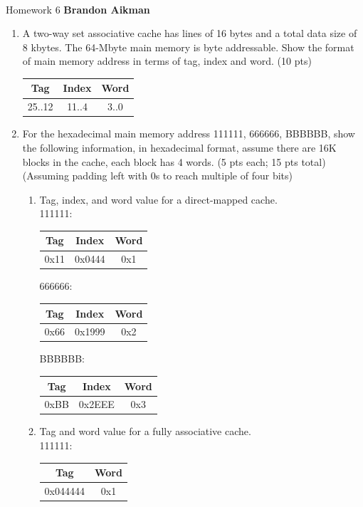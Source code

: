 \documentclass[12pt]{article}
\begin{document}
 \\
Homework 6 \hfill {\bf Brandon Aikman} \\

\begin{enumerate}
	\item A two-way set associative cache has lines of 16 bytes and a total data size of 8 kbytes. The 64-Mbyte main memory is byte addressable. Show the format of main memory address in terms of tag, index and word. (10 pts) \\
	\begin{tabular}{|c|c|c|}
        \hline
        Tag & Index & Word \\
        \hline
        25..12 & 11..4 & 3..0 \\
        \hline
    \end{tabular}
	\item For the hexadecimal main memory address 111111, 666666, BBBBBB, show the following information, in hexadecimal format, assume there are 16K blocks in the cache, each block has 4 words. (5 pts each; 15 pts total) \\
	(Assuming padding left with 0s to reach multiple of four bits)
    \begin{enumerate}
        \item Tag, index, and word value for a direct-mapped cache. \\
            111111: 
            \begin{tabular}{|c|c|c|}
                \hline
                Tag & Index & Word \\
                \hline
                0x11 & 0x0444 & 0x1 \\
                \hline
            \end{tabular}

            666666: 
            \begin{tabular}{|c|c|c|}
                \hline
                Tag & Index & Word \\
                \hline
                0x66 & 0x1999 & 0x2 \\
                \hline
            \end{tabular}

            BBBBBB: 
            \begin{tabular}{|c|c|c|}
                \hline
                Tag & Index & Word \\
                \hline
                0xBB & 0x2EEE & 0x3 \\
                \hline
            \end{tabular}
        \item Tag and word value for a fully associative cache. \\
            111111: 
            \begin{tabular}{|c|c|}
                \hline
                Tag & Word \\
                \hline
                0x044444 & 0x1 \\
                \hline
            \end{tabular}


\end{enumerate}
\end{enumerate}
\end{document}
